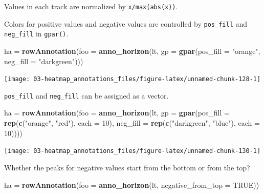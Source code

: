 \documentclass[]{book}
\newenvironment{Shaded}{\begin{snugshade}}{\end{snugshade}}
\newcommand{\KeywordTok}[1]{\textcolor[rgb]{0.13,0.29,0.53}{\textbf{#1}}}
\newcommand{\DataTypeTok}[1]{\textcolor[rgb]{0.13,0.29,0.53}{#1}}
\newcommand{\DecValTok}[1]{\textcolor[rgb]{0.00,0.00,0.81}{#1}}
\newcommand{\StringTok}[1]{\textcolor[rgb]{0.31,0.60,0.02}{#1}}
\newcommand{\OtherTok}[1]{\textcolor[rgb]{0.56,0.35,0.01}{#1}}
\newcommand{\NormalTok}[1]{#1}
\theoremstyle{definition}
\theoremstyle{definition}
\theoremstyle{definition}
\theoremstyle{remark}
\begin{document}
Values in each track are normalized by \texttt{x/max(abs(x))}.

Colors for positive values and negative values are controlled by
\texttt{pos\_fill} and \texttt{neg\_fill} in \texttt{gpar()}.

\begin{Shaded}
\begin{Highlighting}[]
\NormalTok{ha =}\StringTok{ }\KeywordTok{rowAnnotation}\NormalTok{(}\DataTypeTok{foo =} \KeywordTok{anno_horizon}\NormalTok{(lt, }
    \DataTypeTok{gp =} \KeywordTok{gpar}\NormalTok{(}\DataTypeTok{pos_fill =} \StringTok{"orange"}\NormalTok{, }\DataTypeTok{neg_fill =} \StringTok{"darkgreen"}\NormalTok{)))}
\end{Highlighting}
\end{Shaded}

\begin{center}\texttt{[image: 03-heatmap\_annotations\_files/figure-latex/unnamed-chunk-128-1]} \end{center}

\texttt{pos\_fill} and \texttt{neg\_fill} can be assigned as a vector.

\begin{Shaded}
\begin{Highlighting}[]
\NormalTok{ha =}\StringTok{ }\KeywordTok{rowAnnotation}\NormalTok{(}\DataTypeTok{foo =} \KeywordTok{anno_horizon}\NormalTok{(lt, }
    \DataTypeTok{gp =} \KeywordTok{gpar}\NormalTok{(}\DataTypeTok{pos_fill =} \KeywordTok{rep}\NormalTok{(}\KeywordTok{c}\NormalTok{(}\StringTok{"orange"}\NormalTok{, }\StringTok{"red"}\NormalTok{), }\DataTypeTok{each =} \DecValTok{10}\NormalTok{),}
              \DataTypeTok{neg_fill =} \KeywordTok{rep}\NormalTok{(}\KeywordTok{c}\NormalTok{(}\StringTok{"darkgreen"}\NormalTok{, }\StringTok{"blue"}\NormalTok{), }\DataTypeTok{each =} \DecValTok{10}\NormalTok{))))}
\end{Highlighting}
\end{Shaded}

\begin{center}\texttt{[image: 03-heatmap\_annotations\_files/figure-latex/unnamed-chunk-130-1]} \end{center}

Whether the peaks for negative values start from the bottom or from the
top?

\begin{Shaded}
\begin{Highlighting}[]
\NormalTok{ha =}\StringTok{ }\KeywordTok{rowAnnotation}\NormalTok{(}\DataTypeTok{foo =} \KeywordTok{anno_horizon}\NormalTok{(lt, }\DataTypeTok{negative_from_top =} \OtherTok{TRUE}\NormalTok{))}
\end{Highlighting}
\end{Shaded}
\end{document}
